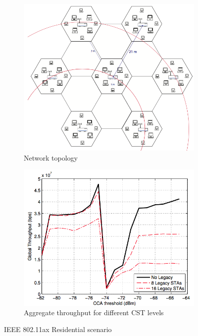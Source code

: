 \documentclass[12pt, a4paper,twoside]{tesi_upf}
\begin{document}
			\begin{figure}[t!]
				\centering
				\begin{subfigure}[b]{0.4\textwidth}
					\includegraphics[width=\textwidth]{images/jamil2014_1}
					\caption{Network topology}
					\label{fig:jamil_2014_1}
				\end{subfigure}
				\begin{subfigure}[b]{0.4\textwidth}
					\includegraphics[width=\textwidth]{images/jamil2014_2}
					\caption{Aggregate throughput for different CST levels}
					\label{fig:jamil_2014_2}
				\end{subfigure}		
				\caption{IEEE 802.11ax Residential scenario}
				\label{fig:jamil_2014}
			\end{figure}		
		
\end{document}
